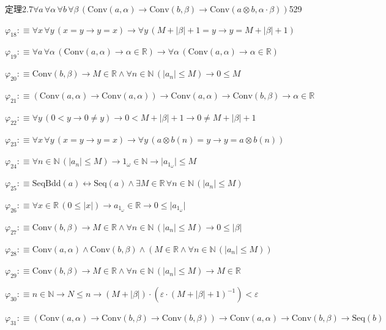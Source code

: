 \begin{fullproof}{定理2.7}{$\forall a\,\forall \alpha\,\forall b\,\forall \beta\,(\mathrm{Conv}(a,\alpha) \to \mathrm{Conv}(b,\beta) \to \mathrm{Conv}(a \otimes b,\alpha \cdot \beta))$}{529}
\begin{abbrevlist}
\item $\varphi_{18} :\equiv \forall x\,\forall y\,(x = y \to y = x) \to \forall y\,(M + \lvert \beta \rvert + 1 = y \to y = M + \lvert \beta \rvert + 1)$
\item $\varphi_{19} :\equiv \forall a\,\forall \alpha\,(\mathrm{Conv}(a,\alpha) \to \alpha \in \mathbb{R}) \to \forall \alpha\,(\mathrm{Conv}(a,\alpha) \to \alpha \in \mathbb{R})$
\item $\varphi_{20} :\equiv \mathrm{Conv}(b,\beta) \to M \in \mathbb{R} \land \forall n \in \mathbb{N}\,(\lvert a_{n} \rvert \leq M) \to 0 \leq M$
\item $\varphi_{21} :\equiv (\mathrm{Conv}(a,\alpha) \to \mathrm{Conv}(a,\alpha)) \to \mathrm{Conv}(a,\alpha) \to \mathrm{Conv}(b,\beta) \to \alpha \in \mathbb{R}$
\item $\varphi_{22} :\equiv \forall y\,(0 < y \to 0 \neq y) \to 0 < M + \lvert \beta \rvert + 1 \to 0 \neq M + \lvert \beta \rvert + 1$
\item $\varphi_{23} :\equiv \forall x\,\forall y\,(x = y \to y = x) \to \forall y\,(a \otimes b(n) = y \to y = a \otimes b(n))$
\item $\varphi_{24} :\equiv \forall n \in \mathbb{N}\,(\lvert a_{n} \rvert \leq M) \to 1_{\omega} \in \mathbb{N} \to \lvert a_{1_{\omega}} \rvert \leq M$
\item $\varphi_{25} :\equiv \mathrm{SeqBdd}(a) \leftrightarrow \mathrm{Seq}(a) \land \exists M \in \mathbb{R}\,\forall n \in \mathbb{N}\,(\lvert a_{n} \rvert \leq M)$
\item $\varphi_{26} :\equiv \forall x \in \mathbb{R}\,(0 \leq \lvert x \rvert) \to a_{1_{\omega}} \in \mathbb{R} \to 0 \leq \lvert a_{1_{\omega}} \rvert$
\item $\varphi_{27} :\equiv \mathrm{Conv}(b,\beta) \to M \in \mathbb{R} \land \forall n \in \mathbb{N}\,(\lvert a_{n} \rvert \leq M) \to 0 \leq \lvert \beta \rvert$
\item $\varphi_{28} :\equiv \mathrm{Conv}(a,\alpha) \land \mathrm{Conv}(b,\beta) \land (M \in \mathbb{R} \land \forall n \in \mathbb{N}\,(\lvert a_{n} \rvert \leq M))$
\item $\varphi_{29} :\equiv \mathrm{Conv}(b,\beta) \to M \in \mathbb{R} \land \forall n \in \mathbb{N}\,(\lvert a_{n} \rvert \leq M) \to M \in \mathbb{R}$
\item $\varphi_{30} :\equiv n \in \mathbb{N} \to N \leq n \to (M + \lvert \beta \rvert) \cdot (\varepsilon \cdot (M + \lvert \beta \rvert + 1)^{-1}) < \varepsilon$
\item $\varphi_{31} :\equiv (\mathrm{Conv}(a,\alpha) \to \mathrm{Conv}(b,\beta) \to \mathrm{Conv}(b,\beta)) \to \mathrm{Conv}(a,\alpha) \to \mathrm{Conv}(b,\beta) \to \mathrm{Seq}(b)$

\end{abbrevlist}
\end{fullproof}
